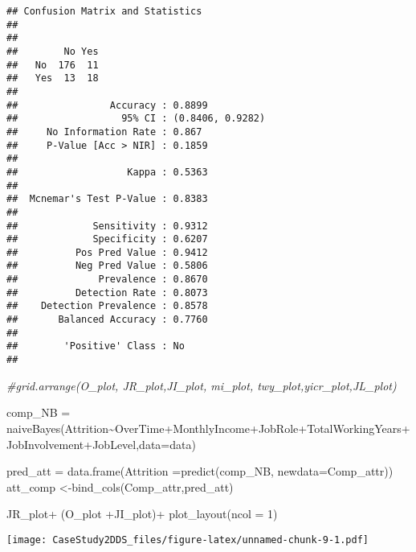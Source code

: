 \documentclass[
]{article}
\newenvironment{Shaded}{\begin{snugshade}}{\end{snugshade}}
\newcommand{\AttributeTok}[1]{\textcolor[rgb]{0.77,0.63,0.00}{#1}}
\newcommand{\CommentTok}[1]{\textcolor[rgb]{0.56,0.35,0.01}{\textit{#1}}}
\newcommand{\DecValTok}[1]{\textcolor[rgb]{0.00,0.00,0.81}{#1}}
\newcommand{\FunctionTok}[1]{\textcolor[rgb]{0.00,0.00,0.00}{#1}}
\newcommand{\NormalTok}[1]{#1}
\newcommand{\OtherTok}[1]{\textcolor[rgb]{0.56,0.35,0.01}{#1}}
\newcommand{\SpecialCharTok}[1]{\textcolor[rgb]{0.00,0.00,0.00}{#1}}
\begin{document}
\begin{verbatim}
## Confusion Matrix and Statistics
## 
##      
##        No Yes
##   No  176  11
##   Yes  13  18
##                                           
##                Accuracy : 0.8899          
##                  95% CI : (0.8406, 0.9282)
##     No Information Rate : 0.867           
##     P-Value [Acc > NIR] : 0.1859          
##                                           
##                   Kappa : 0.5363          
##                                           
##  Mcnemar's Test P-Value : 0.8383          
##                                           
##             Sensitivity : 0.9312          
##             Specificity : 0.6207          
##          Pos Pred Value : 0.9412          
##          Neg Pred Value : 0.5806          
##              Prevalence : 0.8670          
##          Detection Rate : 0.8073          
##    Detection Prevalence : 0.8578          
##       Balanced Accuracy : 0.7760          
##                                           
##        'Positive' Class : No              
## 
\end{verbatim}

\begin{Shaded}
\begin{Highlighting}[]
\CommentTok{\#grid.arrange(O\_plot, JR\_plot,JI\_plot, mi\_plot, twy\_plot,yicr\_plot,JL\_plot)}

\NormalTok{comp\_NB }\OtherTok{=} \FunctionTok{naiveBayes}\NormalTok{(Attrition}\SpecialCharTok{\textasciitilde{}}\NormalTok{OverTime}\SpecialCharTok{+}\NormalTok{MonthlyIncome}\SpecialCharTok{+}\NormalTok{JobRole}\SpecialCharTok{+}\NormalTok{TotalWorkingYears}\SpecialCharTok{+}\NormalTok{JobInvolvement}\SpecialCharTok{+}\NormalTok{JobLevel,}\AttributeTok{data=}\NormalTok{data)}

\NormalTok{pred\_att }\OtherTok{=} \FunctionTok{data.frame}\NormalTok{(}\AttributeTok{Attrition =}\FunctionTok{predict}\NormalTok{(comp\_NB, }\AttributeTok{newdata=}\NormalTok{Comp\_attr))}
\NormalTok{att\_comp }\OtherTok{\textless{}{-}}\FunctionTok{bind\_cols}\NormalTok{(Comp\_attr,pred\_att)}

\NormalTok{JR\_plot}\SpecialCharTok{+}\NormalTok{ (O\_plot }\SpecialCharTok{+}\NormalTok{JI\_plot)}\SpecialCharTok{+} \FunctionTok{plot\_layout}\NormalTok{(}\AttributeTok{ncol =} \DecValTok{1}\NormalTok{)}
\end{Highlighting}
\end{Shaded}

\texttt{[image: CaseStudy2DDS\_files/figure-latex/unnamed-chunk-9-1.pdf]}
\end{document}
